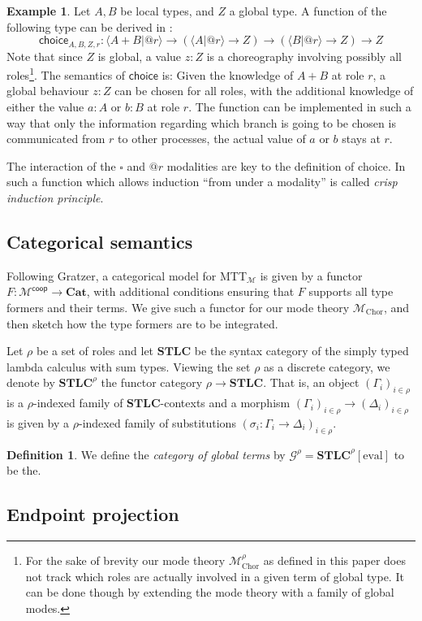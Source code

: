 \documentclass{scrartcl}
\theoremstyle{definition}
\newtheorem{definition}{Definition}
\newtheorem{example}{Example}
\theoremstyle{plain}
\begin{document}
\begin{example}
  Let $A, B$ be local types, and $Z$ a global type. A function of the following
  type can be derived in \ChorMTT:
  \[
    \textsf{choice}_{A,B,Z,r} : \langle A + B | @r \rangle
    \to (\langle A | @r \rangle \to Z)
    \to (\langle B | @r \rangle \to Z)
    \to Z
  \]
  Note that since $Z$ is global, a value $z : Z$ is a choreography involving
  possibly all roles\footnote{For the sake of brevity our mode theory
    $\mathcal{M}^{\rho}_{\textrm{Chor}}$ as defined in this paper does not track which
    roles are actually involved in a given term of global type. It can be done
    though by extending the mode theory with a family of global modes.}. The semantics
  of $\textsf{choice}$ is: Given the knowledge of $A + B$ at role $r$, a global behaviour
  $z : Z$ can be chosen for all roles, with the additional knowledge of either
  the value $a : A$ or $b : B$ at role $r$. The function can be implemented in
  such a way that only the information regarding which branch is going to be
  chosen is communicated from $r$ to other processes, the actual value of $a$ or
  $b$ stays at $r$.

  The interaction of the $\square$ and $@r$ modalities are key to the definition
  of choice. In \cite{gratzer2023syntax} such a function which allows induction ``from under a
  modality'' is called \textit{crisp induction principle}.
\end{example}

\subsection{Categorical semantics}
Following Gratzer, a categorical model for MTT$_{\mathcal{M}}$ is given by a
functor $F : \mathcal{M}^{\textsf{coop}} \to \textbf{Cat}$, with additional
conditions ensuring that $F$ supports all type formers and their terms. We give
such a functor for our mode theory $\mathcal{M}_{\textrm{Chor}}$, and then
sketch how the type formers are to be integrated.

Let $\rho$ be a set of roles and let $\textbf{STLC}$ be the syntax
category of the simply typed lambda calculus with sum types. Viewing the set
$\rho$ as a discrete category, we denote by $\textbf{STLC}^\rho$ the functor
category $\rho \to \textbf{STLC}$. That is, an object $(\Gamma_i)_{i\in\rho}$
is a $\rho$-indexed family of $\textbf{STLC}$-contexts and a morphism
$(\Gamma_i)_{i\in\rho} \to (\Delta_i)_{i\in\rho}$ is given by a $\rho$-indexed
family of substitutions $(\sigma_i : \Gamma_i \to \Delta_i)_{i\in\rho}$.

\begin{definition}
  We define the \textit{category of global terms} by $\mathcal{G}^\rho = \textbf{STLC}^{\rho}[\textrm{eval}]$ to be the.
\end{definition}

\subsection{Endpoint projection}








\end{document}
